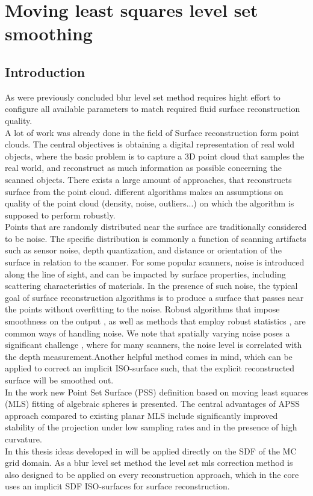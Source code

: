 \chapter{Moving least squares level set smoothing}
\section{Introduction}
As were previously concluded blur level set method requires hight effort to configure all available parameters to match required fluid surface reconstruction quality.\\
A lot of work was already done in the field of Surface reconstruction form point clouds. 
The central objectives is obtaining a digital representation of real wold objects, where the basic problem is to capture a 3D point cloud that samples the real world, and reconstruct as much information as possible concerning the scanned objects. There exists a large amount of approaches, that reconstructs surface from the point cloud. different algorithms makes an assumptions on quality of the point cloud (density, noise, outliers...) on which the algorithm is supposed to perform robustly.\\
Points that are randomly distributed near the surface are traditionally considered to be noise. The specific distribution is commonly a function of scanning artifacts such as sensor noise, depth quantization, and distance or orientation of the surface in relation to the scanner. For some popular scanners, noise is introduced along the line of sight, and can be impacted by surface properties, including scattering characteristics of materials. In the presence of such noise, the typical goal of surface reconstruction algorithms is to produce a surface that passes near the points without overfitting to the noise. Robust algorithms that impose smoothness on the output \cite{PSR}, as well as methods that employ robust statistics \cite{FPPSKR}, are common ways of handling noise. We note that spatially varying noise poses a significant challenge \cite{NSRFRPS}, where for many scanners, the noise level is correlated with the depth measurement.Another helpful method comes in mind, which can be applied to correct an implicit ISO-surface such, that the explicit reconstructed surface will be smoothed out.\\
In the work \cite{Apss} new Point Set Surface (PSS) definition based on moving least squares (MLS) fitting of algebraic spheres is presented. The central advantages of APSS approach compared to existing planar MLS include significantly improved stability of the projection under low sampling rates and in the presence of high curvature.\\
In this thesis ideas developed in \cite{Apss} will be applied directly on the SDF of the MC grid domain. As a blur level set method the level set mls correction method is also designed to be applied on every reconstruction approach, which in the core uses an implicit SDF ISO-surfaces for surface reconstruction.  

